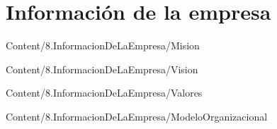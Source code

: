\section{Información de la empresa}

{Content/8.InformacionDeLaEmpresa/Mision}

{Content/8.InformacionDeLaEmpresa/Vision}

{Content/8.InformacionDeLaEmpresa/Valores}

{Content/8.InformacionDeLaEmpresa/ModeloOrganizacional}


